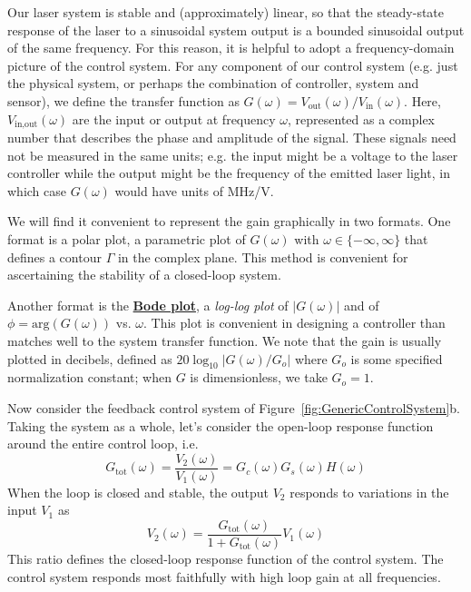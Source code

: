 \documentclass{../lab}
\begin{document}
Our laser system is stable and (approximately) linear, so that the steady-state response of the laser to a sinusoidal system output is a bounded sinusoidal output of the same frequency. For this reason, it is helpful to adopt a frequency-domain picture of the control system. For any component of our control system (e.g. just the physical system, or perhaps the combination of controller, system and sensor), we define the transfer function as $G(\omega) = V_\text{out}(\omega)/V_\text{in}(\omega)$. Here, $V_\text{in,out}(\omega)$ are the input or output at frequency $\omega$, represented as a complex number that describes the phase and amplitude of the signal. These signals need not be measured in the same units; e.g. the input might be a voltage to the laser controller while the output might be the frequency of the emitted laser light, in which case $ G(\omega)$ would have units of MHz/V.

We will find it convenient to represent the gain graphically in two formats. One format is a polar plot, a parametric plot of $G(\omega)$ with $\omega \in \{-\infty, \infty\}$ that defines a contour $\Gamma$ in the complex plane. This method is convenient for ascertaining the stability of a closed-loop system.

Another format is the \href{http://en.wikipedia.org/wiki/Bode\_plot}{\textbf{Bode plot}}, a \emph{log-log plot} of $|G(\omega)|$ and of $\phi = \text{arg}(G(\omega) )$ vs. $\omega$. This plot is convenient in designing a controller than matches well to the system transfer function. We note that the gain is usually plotted in decibels, defined as $ 20\log_{10}|G(\omega)/G_o|$ where $G_o$ is some specified normalization constant; when $G$ is dimensionless, we take $G_o = 1$.

Now consider the feedback control system of Figure~\ref{fig:GenericControlSystem}b. Taking the system as a whole, let’s consider the open-loop response function around the entire control loop, i.e.
\begin{equation}
    G_\text{tot}(\omega) = \frac{V_2(\omega)}{V_1(\omega)} = G_c(\omega)G_s(\omega)H(\omega)
\end{equation}
When the loop is closed and stable, the output $V_2$ responds to variations in the input $V_1$ as
\begin{equation}
    V_2(\omega) = \frac{G_\text{tot}(\omega)}{1+G_\text{tot}(\omega)}V_1(\omega)
\end{equation}
This ratio defines the closed-loop response function of the control system. The control system responds most faithfully with high loop gain at all frequencies.
\end{document}
